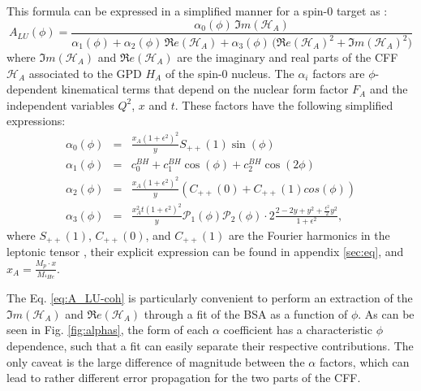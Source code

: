 \documentclass[aps,prc,preprint,superscriptaddress]{revtex4}
\begin{document}
This formula can be expressed in a simplified manner for a spin-0 target as \cite{Belitsky:2008bz}:
\begin{equation}
A_{LU}(\phi) = \frac{\alpha_{0}(\phi) \, \Im m(\mathcal{H}_{A})}
{\alpha_{1}(\phi) + \alpha_{2}(\phi) \, \Re e(\mathcal{H}_{A}) + \alpha_{3}(\phi) \, 
\big( 
\Re e(\mathcal{H}_{A})^{2} + \Im m(\mathcal{H}_{A})^{2} \big)}
\label{eq:A_LU-coh}
\end{equation}
where $\Im m(\mathcal{H}_{A})$ and $\Re e(\mathcal{H}_{A})$ are the imaginary 
and real parts of the CFF $\mathcal{H}_{A}$ associated to the GPD $H_A$ of the 
spin-0 nucleus. The 
$\alpha_{i}$ factors are $\phi$-dependent kinematical terms that depend on the 
nuclear form factor $F_A$ and the independent variables $Q^2$, $x$ and $t$.  
These factors have the following simplified expressions:
\begin{eqnarray}
	\label{eq:alpha1}
   \alpha_0 (\phi) & = &\frac{x_{A}(1+\epsilon^2)^2}{y} S_{++}(1) \sin(\phi)\\
    \alpha_1 (\phi) & = & c_0^{BH}+c_1^{BH} \cos({\phi})+c_2^{BH} \cos(2\phi)\\ 
   \alpha_2 (\phi) & = & \frac{x_{A}(1+\epsilon^2)^2}{y}  \left( C_{++}(0) +  
C_{++}(1) cos(\phi) \right)\\
\alpha_3 (\phi) &=& \frac{x^{2}_{A}t(1+\epsilon^2)^2}{y} {\mathcal P}_1(\phi) 
{\mathcal P}_2(\phi) \cdot 2 \frac{2-2y+y^2 + \frac{\epsilon^2}{2}y^2}{1 + 
\epsilon^2},
	\label{eq:alpha4}
\end{eqnarray}
where $S_{++}(1)$, $C_{++}(0)$, and $C_{++}(1)$ are the Fourier harmonics in the 
leptonic tensor \cite{Belitsky:2008bz}, their explicit expression can be found in 
appendix \ref{sec:eq}, and $x_{A} = \frac{M_{p}\cdot x}{M_{^4\!He}}$. 

The Eq. \ref{eq:A_LU-coh} is particularly convenient to perform an extraction of 
the $\Im m(\mathcal{H}_{A})$ and $\Re e(\mathcal{H}_{A})$ through a fit of the BSA as 
a function of $\phi$. As can be seen in Fig. \ref{fig:alphas}, the form of each 
$\alpha$ coefficient has a characteristic $\phi$ dependence, such that a fit can
easily separate their respective contributions. The only caveat
is the large difference of magnitude between the $\alpha$ factors, which can lead to 
rather different error propagation for the two parts of the CFF.
\end{document}
